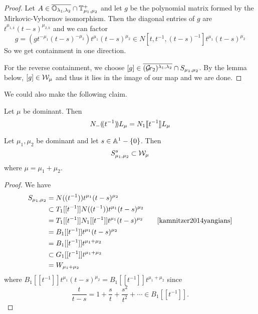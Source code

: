 \documentclass[draft]{article}
\begin{document}
\begin{proof}
    Let $ A \in \overline{\OO_{\lambda_1,\lambda_2}}\cap\TT_{\mu_1,\mu_2}^+$ and let $ g $ be the polynomial matrix formed by the Mirkovic-Vybornov isomorphism.  Then the diagonal entries of $ g $ are $ t^{\mu_{1,k}} (t-s)^{\mu_{2,k}}$ and we can factor
    $$ g = (g t^{-\mu_1}(t-s)^{-\mu_2}) t^{\mu_1}(t-s)^{\mu_2} \in N[t, t^{-1}, (t-s)^{-1}] t^{\mu_1} (t-s)^{\mu_2}$$
    So we get containment in one direction.
    
    For the reverse containment, we choose $ [g] \in \overline{(\Grbd[2])^{\lambda_1,\lambda_2}}\cap S_{\mu_1,\mu_2}$.  By the lemma below, $[g] \in \cW_\mu$ and thus it lies in the image of our map and we are done.
\end{proof}



We could also make the following claim. 


\begin{lemma}[KWWY14]
    Let $\mu$ be dominant. Then 
    \begin{equation}
        N_{-}\xT[t^{-1}] L_\mu = N_1\xt[t^{-1}]L_\mu
    \end{equation}
\end{lemma}

\begin{lemma}%
    Let $\mu_1,\mu_2$ be dominant and let $s\in \AA^1 - \{0\}$. Then 
    \begin{equation}
        S_{\mu_1,\mu_2}^s \subset \cW_\mu 
    \end{equation}
    where $\mu = \mu_1 + \mu_2$.
\end{lemma}

\begin{proof}
    We have
\[
\begin{split}
    S_{\mu_1, \mu_2} & = N((t^{-1}))t^{\mu_1}(t-s)^{\mu_2} \\
     & \subset T_1[[t^{-1}]] N((t^{-1})) t^{\mu_1} (t-s)^{\mu_2} \\
     & = T_1[[t^{-1}]] N_1[[t^{-1}]] t^{\mu_1} (t-s)^{\mu_2} \qquad \text{\cite[Lemma 2.3]{kamnitzer2014yangians}}\\
     & = B_1[[t^{-1}]] t^{\mu_1} (t-s)^{\mu_2} \\
     & = B_1[[t^{-1}]] t^{\mu_1 + \mu_2} \\
     & \subset G_1[[t^{-1}]] t^{\mu_1 + \mu_2} \\
     & = W_{\mu_1 + \mu_2}
\end{split}
\]
where $B_1[[t^{-1}]] t^{\mu_1} (t-s)^{\mu_2} = B_1[[t^{-1}]] t^{\mu_1 + \mu_2}$ since 
\[
\frac{t}{t-s} = 
1 + \frac{s}{t} + \frac{s^2}{t^2} + \cdots 
\in B_1[[t^{-1}]].
\]
\end{proof}
\end{document}

